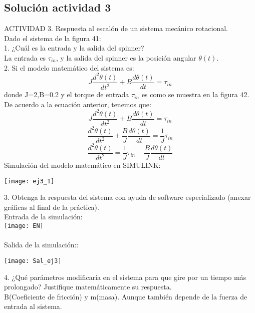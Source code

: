 \subsection{Solución actividad 3}

ACTIVIDAD 3. Respuesta al escalón de un sistema mecánico rotacional.\\
Dado el sistema de la figura 41:\\

1. ¿Cuál es la entrada y la salida del spinner?\\
La entrada es $\tau_{in}$, y la salida del spinner es la posición angular $\theta(t)$.\\ 


2. Si el modelo matemático del sistema es:\\
$$J\frac{d^2 \theta(t)}{dt^2} + B\frac{d\theta(t)}{dt} = \tau_{in}$$
donde J=2,B=0.2 y el torque de entrada $\tau_{in}$ es como se muestra en la figura 42.\\
De acuerdo a la ecuación anterior, tenemos que:
$$J\frac{d^2 \theta(t)}{dt^2} + B\frac{d\theta(t)}{dt} = \tau_{in}$$
$$\frac{d^2 \theta(t)}{dt^2} + \frac{B}{J}\frac{d\theta(t)}{dt} = \frac{1}{J}\tau_{in}$$
$$\frac{d^2 \theta(t)}{dt^2} = \frac{1}{J}\tau_{in} - \frac{B}{J}\frac{d\theta(t)}{dt}$$
Simulación del modelo matemático en SIMULINK:\\


\begin{center}
	\texttt{[image: ej3\_1]}
\end{center}



3. Obtenga la respuesta del sistema con ayuda de software especializado (anexar gráficas al final de la práctica).\\
Entrada de la simulación:\\
\texttt{[image: EN]} \\\\
Salida de la simulación::\\

\begin{center}
	\texttt{[image: Sal\_ej3]}
\end{center}



4. ¿Qué parámetros modificaría en el sistema para que gire por un tiempo más prolongado? Justifique matemáticamente su respuesta.\\
B(Coeficiente de fricción) y m(masa). Aunque también depende de la fuerza de entrada al sistema.
